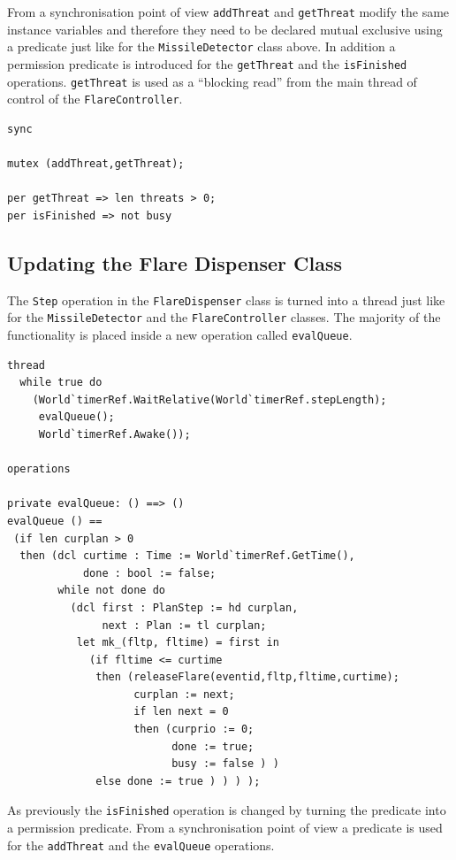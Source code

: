 \documentclass{overturerepchap}
\begin{document}
From a synchronisation point of view \texttt{addThreat} and 
\texttt{getThreat} modify the same instance variables and
therefore they need to be declared mutual exclusive using a
{\bf{}} 
predicate just like for the \texttt{MissileDetector} class above. 
In addition a permission predicate is introduced for the
\texttt{getThreat} and the \texttt{isFinished} operations. 
\texttt{getThreat} is used as a ``blocking read'' from the main
thread of control of the \texttt{FlareController}.

\begin{lstlisting}
sync

mutex (addThreat,getThreat);

per getThreat => len threats > 0;
per isFinished => not busy
\end{lstlisting}

\subsection{Updating the Flare Dispenser Class}

The \texttt{Step} operation in the \texttt{FlareDispenser} class is
turned into a thread just like for the \texttt{MissileDetector} and
the \texttt{FlareController} classes. The majority of the functionality
is placed inside a new operation called \texttt{evalQueue}.

\begin{lstlisting}
thread
  while true do
    (World`timerRef.WaitRelative(World`timerRef.stepLength);
     evalQueue();
     World`timerRef.Awake());
     
operations

private evalQueue: () ==> ()
evalQueue () ==
 (if len curplan > 0
  then (dcl curtime : Time := World`timerRef.GetTime(),
            done : bool := false;
        while not done do
          (dcl first : PlanStep := hd curplan,
               next : Plan := tl curplan;
           let mk_(fltp, fltime) = first in
             (if fltime <= curtime
              then (releaseFlare(eventid,fltp,fltime,curtime);
                    curplan := next;
                    if len next = 0
                    then (curprio := 0; 
                          done := true; 
                          busy := false ) )
              else done := true ) ) ) );
\end{lstlisting}

As previously the \texttt{isFinished} operation is changed by turning
the predicate into a permission predicate. From a synchronisation point of
view a {\bf{}} predicate is used for the \texttt{addThreat} and the 
\texttt{evalQueue} operations.
\end{document}

